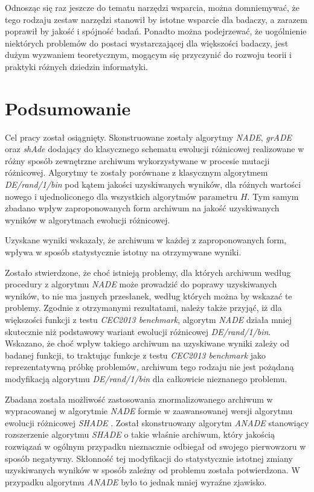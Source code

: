 \documentclass[12pt,a4paper]{report}
\begin{document}
{{{{{{{{\begin{description}
\end{description}
}
\par{
Odnosząc się raz jeszcze do tematu narzędzi wsparcia, można domniemywać, że tego rodzaju zestaw narzędzi stanowił by istotne wsparcie dla badaczy, a zarazem poprawił by jakość i spójność badań. Ponadto można podejrzewać, że uogólnienie niektórych problemów do postaci wystarczającej dla większości badaczy, jest dużym wyzwaniem teoretycznym, mogącym się przyczynić do rozwoju teorii i praktyki różnych dziedzin informatyki.
}


\chapter{Podsumowanie}
\par{
Cel pracy został osiągnięty. Skonstruowane zostały algorytmy \emph{NADE}, \emph{grADE} oraz \emph{shAde} dodający do klasycznego schematu ewolucji różnicowej realizowane w różny sposób zewnętrzne archiwum wykorzystywane w procesie mutacji różnicowej. Algorytmy te zostały porównane z klasycznym algorytmem \emph{DE/rand/1/bin} pod kątem jakości uzyskiwanych wyników, dla różnych wartości nowego i ujednoliconego dla wszystkich algorytmów parametru $H$. Tym samym zbadano wpływ zaproponowanych form archiwum na jakość uzyskiwanych wyników w algorytmach ewolucji różnicowej.
}
\par{
Uzyskane wyniki wskazały, że archiwum w każdej z zaproponowanych form, wpływa w sposób statystycznie istotny na otrzymywane wyniki.
}
\par{
Zostało stwierdzone, że choć istnieją problemy, dla których archiwum według procedury z algorytmu \emph{NADE} może prowadzić do poprawy uzyskiwanych wyników, to nie ma jasnych przesłanek, według których można by wskazać te problemy. Zgodnie z otrzymanymi rezultatami, należy także przyjąć, iż dla większości funkcji z testu \emph{CEC2013 benchmark}, algorytm \emph{NADE} działa mniej skutecznie niż podstawowy wariant ewolucji różnicowej \emph{DE/rand/1/bin}. Wskazano, że choć wpływ takiego archiwum na uzyskiwane wyniki zależy od badanej funkcji, to traktując funkcje z testu \emph{CEC2013 benchmark} jako reprezentatywną próbkę problemów, archiwum tego rodzaju nie jest pożądaną modyfikacją algorytmu \emph{DE/rand/1/bin} dla całkowicie nieznanego problemu.
}
\par{
Zbadana została możliwość zastosowania znormalizowanego archiwum w wypracowanej w algorytmie \emph{NADE} formie w zaawansowanej wersji algorytmu ewolucji różnicowej \emph{SHADE} \cite{SHADE}. Został skonstruowany algorytm \emph{ANADE} stanowiący rozszerzenie algorytmu \emph{SHADE} o takie właśnie archiwum, który jakością rozwiązań w ogólnym przypadku nieznacznie odbiegał od swojego pierwowzoru w sposób negatywny. Skłonność tej modyfikacji do statystycznie istotnej zmiany uzyskiwanych wyników w sposób zależny od problemu została potwierdzona. W przypadku algorytmu \emph{ANADE} było to jednak mniej wyraźne zjawisko.
}}}}}}}}
\end{document}
